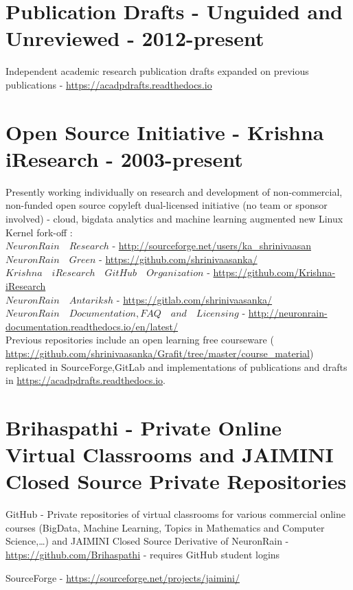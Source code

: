 \documentclass[11pt,onecolumn]{article}
\begin{document}
\section{Publication Drafts - Unguided and Unreviewed - 2012-present}
Independent academic research publication drafts expanded on previous publications - \url {https://acadpdrafts.readthedocs.io}

\section{Open Source Initiative - Krishna iResearch - 2003-present}
Presently working individually on research and development of non-commercial, non-funded open source copyleft dual-licensed initiative (no team or sponsor involved) - cloud, bigdata analytics and machine learning augmented new Linux Kernel fork-off $:$ \\
 $NeuronRain \quad Research$ - \url {http://sourceforge.net/users/ka_shrinivaasan} \\
 $NeuronRain \quad Green$ - \url {https://github.com/shrinivaasanka/} \\
 $Krishna \quad iResearch \quad GitHub \quad Organization$ - \url {https://github.com/Krishna-iResearch} \\
 $NeuronRain \quad Antariksh$ - \url {https://gitlab.com/shrinivaasanka/} \\
 $NeuronRain \quad Documentation, FAQ \quad and \quad Licensing$ - \url {http://neuronrain-documentation.readthedocs.io/en/latest/} \\
Previous repositories include an open learning free courseware ( \url {https://github.com/shrinivaasanka/Grafit/tree/master/course_material})  replicated in SourceForge,GitLab and implementations of publications and drafts in \url {https://acadpdrafts.readthedocs.io}.

\section{Brihaspathi - Private Online Virtual Classrooms and JAIMINI Closed Source Private Repositories}

GitHub - Private repositories of virtual classrooms for various commercial online courses (BigData, Machine Learning, Topics in Mathematics and Computer Science,…) and JAIMINI Closed Source Derivative of NeuronRain - \url {https://github.com/Brihaspathi} - requires GitHub student logins

SourceForge - \url {https://sourceforge.net/projects/jaimini/}
\end{document}
